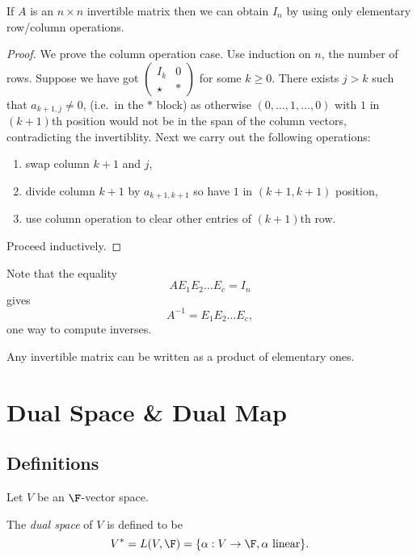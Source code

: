 \documentclass[a4paper]{article}
\theoremstyle{definition}
\begin{document}
\begin{lemma}
  If \(A\) is an \(n\times n\) invertible matrix then we can obtain \(I_n\) by using only elementary row/column operations.
\end{lemma}

\begin{proof}
  We prove the column operation case. Use induction on \(n\), the number of rows. Suppose we have got \(\begin{pmatrix} I_k & 0 \\ \star & \ast \end{pmatrix}\) for some \(k\geq 0\). There exists \(j>k\) such that \(a_{k+1,j}\neq 0\), (i.e.\ in the \(\ast\) block) as otherwise \((0,\dots,1,\dots, 0)\) with \(1\) in \((k+1)\)th position would not be in the span of the column vectors, contradicting the invertiblity. Next we carry out the following operations:
  \begin{enumerate}
  \item swap column \(k+1\) and \(j\),
  \item divide column \(k+1\) by \(a_{k + 1, k + 1}\) so have \(1\) in \((k+1,k+1)\) position,
  \item use column operation to clear other entries of \((k+1)\)th row.
  \end{enumerate}
  Proceed inductively.
\end{proof}

Note that the equality
\[
  AE_1E_2\dots E_c = I_n
\]
gives
\[
  A^{-1} = E_1E_2\dots E_c,
\]
one way to compute inverses.

\begin{proposition}
  Any invertible matrix can be written as a product of elementary ones.
\end{proposition}

\section{Dual Space \& Dual Map}

\subsection{Definitions}

Let \(V\) be an \(\F\)-vector space.

\begin{definition}
  The \emph{dual space} of \(V\) is defined to be
  \[
    V^* = L(V,\F) = \{\alpha:V\to \F, \alpha \text{ linear}\}.
  \]
\end{definition}
\end{document}
